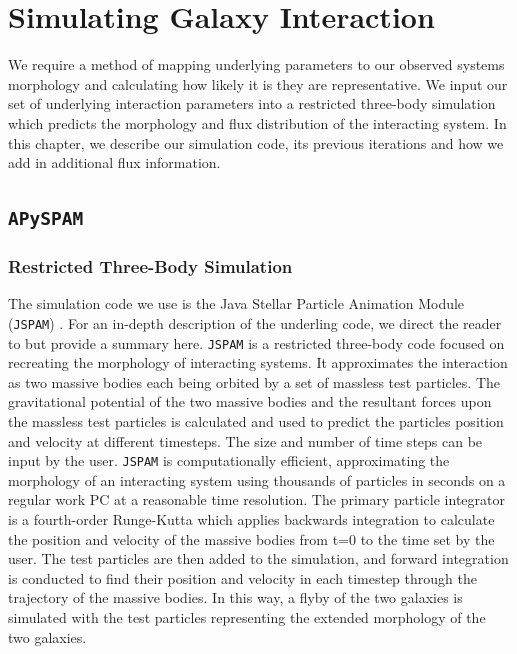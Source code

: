 \section{Simulating Galaxy Interaction}\label{Methods: sims}
\noindent We require a method of mapping underlying parameters to our observed systems morphology and calculating how likely it is they are representative. We input our set of underlying interaction parameters into a restricted three-body simulation which predicts the morphology and flux distribution of the interacting system. In this chapter, we describe our simulation code, its previous iterations and how we add in additional flux information.

\subsection{\texttt{APySPAM}}\label{sec:simulations}
\subsubsection{Restricted Three-Body Simulation}\label{sec:apyspam}
The simulation code we use is the Java Stellar Particle Animation Module (\texttt{JSPAM}) \citep{2016A&C....16...26W}. For an in-depth description of the underling code, we direct the reader to \citet{1990AJ....100.1477W,2016A&C....16...26W} but provide a summary here. \texttt{JSPAM} is a restricted three-body code focused on recreating the morphology of interacting systems. It approximates the interaction as two massive bodies each being orbited by a set of massless test particles. The gravitational potential of the two massive bodies and the resultant forces upon the massless test particles is calculated and used to predict the particles position and velocity at different timesteps. The size and number of time steps can be input by the user. \texttt{JSPAM} is computationally efficient, approximating the morphology of an interacting system using thousands of particles in seconds on a regular work PC at a reasonable time resolution. The primary particle integrator is a fourth-order Runge-Kutta which applies backwards integration to calculate the position and velocity of the massive bodies from t=0 to the time set by the user. The test particles are then added to the simulation, and forward integration is conducted to find their position and velocity in each timestep through the trajectory of the massive bodies. In this way, a flyby of the two galaxies is simulated with the test particles representing the extended morphology of the two galaxies. 

